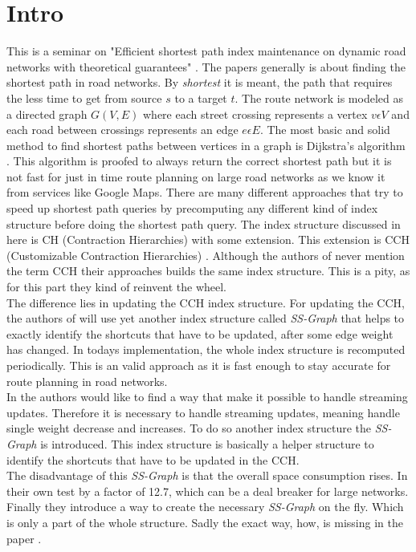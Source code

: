 \documentclass[twocolumn]{article}
\begin{document}


\section{Intro}

This is a seminar on "Efficient shortest path index maintenance on dynamic
road networks with theoretical guarantees" \cite{Ouyang2020}. The papers generally is
about finding the shortest path in road networks. By \textit{shortest} it is meant,
the path that requires the less time to get from source $s$ to a target $t$. The route
network is modeled as a directed graph $G(V,E)$ where each street crossing represents a
vertex $v \epsilon V$ and each road between crossings represents an edge $e \epsilon E$.
The most basic and solid method to find shortest paths between vertices in a graph is
Dijkstra's algorithm \cite{Dijkstra1959}. This algorithm is proofed to always return the
correct shortest path but it is not fast for just in time route planning on large
road networks as we know it from services like Google Maps. There are many
different approaches that try to speed up shortest path queries by precomputing 
any different kind of index structure before doing the shortest path query. The index 
structure discussed in here \cite{Ouyang2020} is CH (Contraction Hierarchies)\cite{Geisberger}
with some extension. This extension is CCH (Customizable Contraction Hierarchies) 
\cite{Dibbelt2014}. Although the authors of \cite{Ouyang2020} never mention the term
CCH their approaches builds the same index structure. This is a pity, as for this part 
they kind of reinvent the wheel. 
\\
The difference lies in updating 
the CCH index structure. For updating the CCH, the authors of \cite{Ouyang2020} will use yet another
index structure called \textit{SS-Graph} that helps to exactly identify the shortcuts that
have to be updated, after some edge weight has changed. In todays implementation, the whole
index structure is recomputed periodically. This is an valid approach as it is fast enough 
to stay accurate for route planning in road networks.
\\
In \cite{Ouyang2020} the authors would like to find a way that make it possible to handle streaming
updates. Therefore it is necessary to handle streaming updates, meaning handle single weight decrease
and increases. To do so another index structure the \textit{SS-Graph} is introduced.
This index structure is basically a helper structure to identify the shortcuts
that have to be updated in the CCH. 
\\
The disadvantage of this \textit{SS-Graph} is that the overall space consumption rises.
In their own test by a factor of 12.7, which can be a deal breaker for large networks.
Finally they introduce a way to create the necessary \textit{SS-Graph} on the fly. Which 
is only a part of the whole structure. 
Sadly the exact way, how, is missing in the paper \cite{Ouyang2020}.


\newpage


\end{document}
